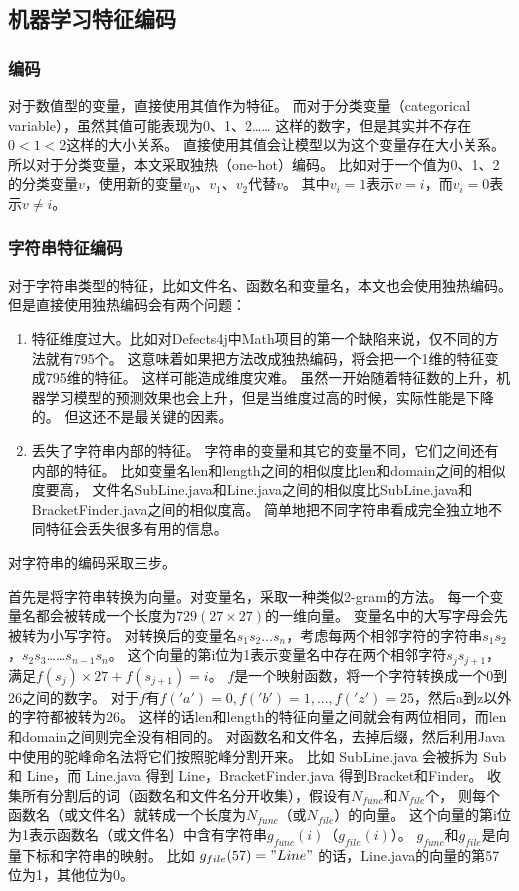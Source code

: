 \subsection{机器学习特征编码}

\subsubsection{编码}

对于数值型的变量，直接使用其值作为特征。
而对于分类变量（categorical variable），虽然其值可能表现为0、1、2……
这样的数字，但是其实并不存在$0 < 1 < 2$这样的大小关系。
直接使用其值会让模型以为这个变量存在大小关系。
所以对于分类变量，本文采取独热（one-hot）编码。
比如对于一个值为0、1、2的分类变量$v$，使用新的变量$v_0$、$v_1$、$v_2$代替$v$。
其中$v_i = 1$表示$v = i$，而$v_i = 0$表示$v \ne i$。

\subsubsection{字符串特征编码}

对于字符串类型的特征，比如文件名、函数名和变量名，本文也会使用独热编码。
但是直接使用独热编码会有两个问题：
\begin{enumerate}
\item 特征维度过大。比如对Defects4j中Math项目的第一个缺陷来说，仅不同的方法就有795个。
这意味着如果把方法改成独热编码，将会把一个1维的特征变成795维的特征。
这样可能造成维度灾难\parencite{Richard1957Dynamic}。
虽然一开始随着特征数的上升，机器学习模型的预测效果也会上升，但是当维度过高的时候，实际性能是下降的。
但这还不是最关键的因素。
\item 丢失了字符串内部的特征。
字符串的变量和其它的变量不同，它们之间还有内部的特征。
比如变量名len和length之间的相似度比len和domain之间的相似度要高，
文件名SubLine.java和Line.java之间的相似度比SubLine.java和BracketFinder.java之间的相似度高。
简单地把不同字符串看成完全独立地不同特征会丢失很多有用的信息。
\end{enumerate}

对字符串的编码采取三步。

首先是将字符串转换为向量。对变量名，采取一种类似2-gram的方法。
每一个变量名都会被转成一个长度为$729 (27 \times 27)$的一维向量。
变量名中的大写字母会先被转为小写字符。
对转换后的变量名$s_1s_2...s_n$，考虑每两个相邻字符的字符串$s_1s_2$，$s_2s_3$……$s_{n - 1}s_n$。
这个向量的第i位为1表示变量名中存在两个相邻字符$s_js_{j+1}$，满足$f(s_j) \times 27 + f(s_{j + 1}) = i$。
$f$是一个映射函数，将一个字符转换成一个0到26之间的数字。
对于$f$有$f('a') = 0, f('b') = 1, ..., f('z') = 25$，然后a到z以外的字符都被转为26。
这样的话len和length的特征向量之间就会有两位相同，而len和domain之间则完全没有相同的。
对函数名和文件名，去掉后缀，然后利用Java中使用的驼峰命名法将它们按照驼峰分割开来。
比如 SubLine.java 会被拆为 Sub 和 Line，而 Line.java 得到 Line，BracketFinder.java 得到Bracket和Finder。
收集所有分割后的词（函数名和文件名分开收集），假设有$N_{func}$和$N_{file}$个，
则每个函数名（或文件名）就转成一个长度为$N_{func}$（或$N_{file}$）的向量。
这个向量的第i位为1表示函数名（或文件名）中含有字符串$g_{func}(i)$（$g_{file}(i)$）。
$g_{func}$和$g_{file}$是向量下标和字符串的映射。
比如 $g_{file}(57) = "Line"$ 的话，Line.java的向量的第57位为1，其他位为0。

